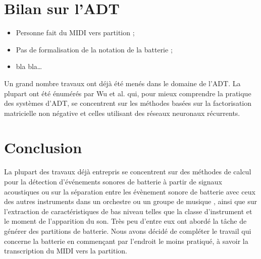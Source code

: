 \section{Bilan sur l’ADT}
\begin{itemize}
	\item Personne fait du MIDI vers partition ;
	\item Pas de formalisation de la notation de la batterie ;
	\item bla bla…
\end{itemize}
Un grand nombre travaux ont déjà été menés dans le domaine de l’ADT. La plupart ont été énumérés par Wu et al. \cite{Review_ADT} qui, pour mieux comprendre la pratique des systèmes d’ADT, se concentrent sur les méthodes basées sur la factorisation matricielle non négative et celles utilisant des réseaux neuronaux récurrents.\\
\section*{Conclusion}
La plupart des travaux déjà entrepris se concentrent sur des méthodes de calcul pour la détection d'événements sonores de batterie à partir de signaux acoustiques ou sur la séparation entre les évènement sonore de batterie avec ceux des autres instruments dans un orchestre ou un groupe de musique \cite{2802}, ainsi que sur l'extraction de caractéristiques de bas niveau telles que la classe d'instrument et le moment de l'apparition du son. Très peu d'entre eux ont abordé la tâche de générer des partitions de batterie.
Nous avons décidé de compléter le travail qui concerne la batterie en commençant par l’endroit le moins pratiqué, à savoir la transcription du MIDI vers la partition.